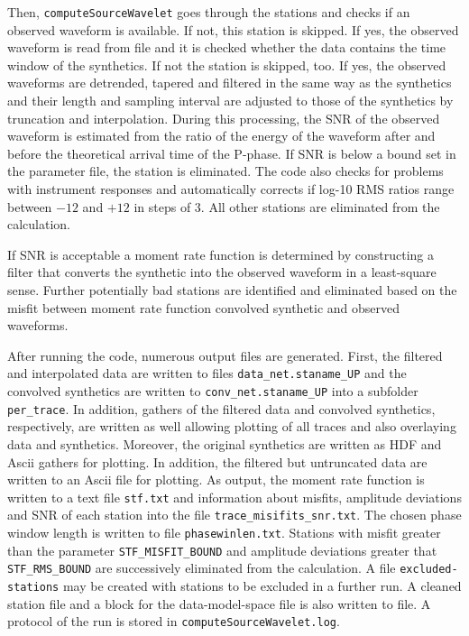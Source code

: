 Then, \verb+computeSourceWavelet+ goes through the stations and checks if an observed waveform is available. If not, this station is skipped. If yes, the observed waveform is read from file and it is checked whether the data contains the time window of the synthetics. If not the station is skipped, too. If yes, the observed waveforms are detrended, tapered and filtered in the same way as the synthetics and their length and sampling interval are adjusted to those of the synthetics by truncation and interpolation. During this processing, the SNR of the observed waveform is estimated from the ratio of the energy of the waveform after and before the theoretical arrival time of the P-phase. If SNR is below a bound set in the parameter file, the station is eliminated. The code also checks for problems with instrument responses and automatically corrects if log-10 RMS ratios range between $-12$ and $+12$ in steps of $3$. All other stations are eliminated from the calculation.

If SNR is acceptable a moment rate function is determined by constructing a filter that converts the synthetic into the observed waveform in a least-square sense. Further potentially bad stations are identified and eliminated based on the misfit between moment rate function convolved synthetic and observed waveforms.

After running the code, numerous output files are generated. First, the filtered and interpolated data are written to files \verb+data_net.staname_UP+ and the convolved synthetics are written to \verb+conv_net.staname_UP+ into a subfolder \verb+per_trace+. In addition, gathers of the filtered data and convolved synthetics, respectively, are written as well allowing plotting of all traces and also overlaying data and synthetics. Moreover, the original synthetics are written as HDF and Ascii gathers for plotting. In addition, the filtered but untruncated data are written to an Ascii file for plotting. As output, the moment rate function is written to a text file \verb+stf.txt+ and information about misfits, amplitude deviations and SNR of each station into the file \verb+trace_misifits_snr.txt+. The chosen phase window length is written to file \verb+phasewinlen.txt+. Stations with misfit greater than the parameter \verb+STF_MISFIT_BOUND+ and amplitude deviations greater that \verb+STF_RMS_BOUND+ are successively eliminated from the calculation. A file \verb+excluded-stations+ may be created with stations to be excluded in a further run. A cleaned station file and a block for the data-model-space file is also written to file. A protocol of the run is stored in \verb+computeSourceWavelet.log+.

